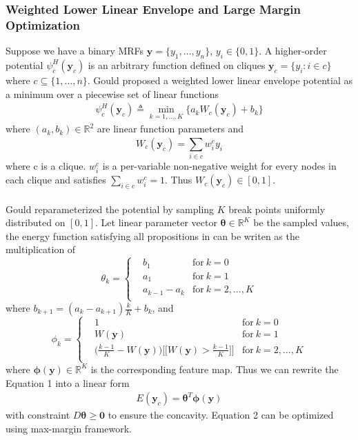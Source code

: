 \documentclass{article}
\begin{document}
		\subsubsection{Weighted Lower Linear Envelope and Large Margin Optimization}
		Suppose we have a binary MRFs $\mathbf{y}=\{y_1,\dots,y_n\}$, $y_i\in\{0,1\}$. A higher-order potential $\psi_c^H(\mathbf{y}_c)$ is an arbitrary function defined on cliques $\mathbf{y}_c=\{y_i : i\in c\}$ where $c\subseteq\{1,\dots,n\}$. Gould\cite{gouldlearning} proposed a weighted lower linear envelope potential as a minimum over a piecewise set of linear functions
		\begin{align}
		\psi_c^H(\mathbf{y}_c) \triangleq \min_{k=1,\dots,K}\bigg\{a_kW_c(\mathbf{y}_c)+b_k\bigg\}
		\end{align}
		where $(a_k,b_k)\in\mathbb{R}^2$ are linear function parameters and
		$$
		W_c(\mathbf{y}_c) = \sum_{i\in c}^{}w_i^cy_i
		$$
		where c is a clique. $w_i^c$ is a per-variable non-negative weight for every nodes in each clique and satisfies $\sum_ {i\in c}^{}w_i^c=1$. Thus $W_c(\mathbf{y}_c) \in [0,1]$.\\\\
		Gould\cite{gouldlearning} reparameterized the potential by sampling $K$ break points uniformly distributed on $[0,1]$. Let linear parameter vector $\boldsymbol{\theta}\in\mathbb{R}^K$ be the sampled values, the energy function satisfying all propositions in \cite{gouldlearning} can be writen as the multiplication of
		\begin{equation*}
		\theta_k = \left\{
		\begin{aligned}
		& b_1	& \text{for} \ k=0\\
		& a_1 & \text{for}\ k=1\\
		& a_{k-1}-a_k  & \text{for} \ k=2,\dots,K\\
		\end{aligned}
		\right.
		\end{equation*}
		where $b_{k+1}=(a_k-a_{k+1})\frac{k}{K}+b_k$, and
		\begin{equation*}
		\phi_k = \left\{
		\begin{aligned}
		& 1	& \text{for} \ k=0\\
		& W(\mathbf{y}) & \text{for}\ k=1\\
		& \bigg(\frac{k-1}{K}-W(\mathbf{y}) \bigg)\bigg[\bigg[ W(\mathbf{y}) > \frac{k-1}{K}\bigg]\bigg]  & \text{for} \ k=2,\dots,K\\
		\end{aligned}
		\right.
		\end{equation*}
		where $\boldsymbol{\phi}(\mathbf{y})\in \mathbb{R}^K$ is the corresponding feature map. Thus we can rewrite the Equation 1 into a linear form
		\begin{align}
		E(\mathbf{y}_c)=\boldsymbol{\theta}^T\boldsymbol{\phi}(\mathbf{y})
		\end{align}
		with constraint $ D\boldsymbol{\theta}\geq \mathbf{0}$ to ensure the concavity. Equation 2 can be optimized using max-margin framework.
		
\end{document}
